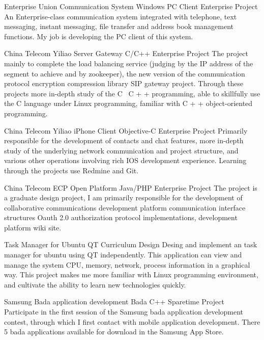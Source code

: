 \documentclass[11pt,a4paper]{moderncv}
\begin{document}
{Enterprise Union Communication System}
{Windows PC Client}
{Enterprise Project}{}
{
An Enterprise-class communication system integrated with telephone, text messaging, instant messaging,
file transfer and address book management functions. My job is developing the PC client of this system.
}

\vspace*{0.2\baselineskip}
{China Telecom Yiliao Server Gateway}
{C/C++}
{Enterprise Project}{}
{
The project mainly to complete the load balancing service (judging by the IP address of the segment to achieve and by zookeeper), the new version of the communication protocol encryption compression library SIP gateway project. Through these projects more in-depth study of the C \ C + + programming, able to skillfully use the C language under Linux programming, familiar with C + + object-oriented programming.
}

\vspace*{0.2\baselineskip}
{China Telecom Yiliao iPhone Client}
{Objective-C}
{Enterprise Project}{}
{
Primarily responsible for the development of contacts and chat features, more in-depth study of the underlying network communication and project structure, and various other operations involving rich IOS development experience. Learning through the projects use Redmine and Git.
}

\vspace*{0.2\baselineskip}
{China Telecom ECP Open Platform}
{Java/PHP}
{Enterprise Project}{}
{
The project is a graduate design project, I am primarily responsible for the development of collaborative communications development platform communication interface structures Oauth 2.0 authorization protocol implementations, development platform wiki site.
}

\vspace*{0.2\baselineskip}
{Task Manager for Ubuntu}
{QT}
{Curriculum Design}{}
{
Desing and implement an task manager for ubuntu using QT independently. This application can view and manage
the system CPU, memory, network, process information  in a graphical way. This project makes me more familiar
with Linux programming environment, and cultivate the ability to learn new technologies quickly.
}

\vspace*{0.2\baselineskip}
{Samsung Bada application development}
{Bada C++}
{Sparetime Project}{}
{Participate in the first session of the Samsung bada application development contest, through which I first contact with mobile
application development. There 5 bada applications available for download in the Samsung App Store.
}
\end{document}
